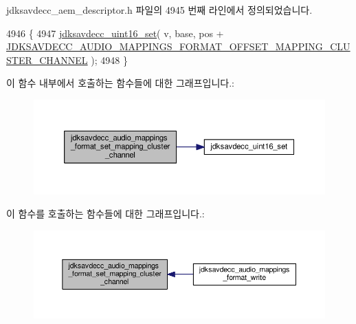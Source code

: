 jdksavdecc\+\_\+aem\+\_\+descriptor.\+h 파일의 4945 번째 라인에서 정의되었습니다.


\begin{DoxyCode}
4946 \{
4947     \hyperlink{group__endian_ga14b9eeadc05f94334096c127c955a60b}{jdksavdecc\_uint16\_set}( v, base, pos + 
      \hyperlink{group__audio__mappings__format_gada8b69df4c259ff90dd16955a184183c}{JDKSAVDECC\_AUDIO\_MAPPINGS\_FORMAT\_OFFSET\_MAPPING\_CLUSTER\_CHANNEL}
       );
4948 \}
\end{DoxyCode}


이 함수 내부에서 호출하는 함수들에 대한 그래프입니다.\+:
\nopagebreak
\begin{figure}[H]
\begin{center}
\leavevmode
\includegraphics[width=350pt]{group__audio__mappings__format_ga777e2ccdef88d311abffb4ccd193b34c_cgraph}
\end{center}
\end{figure}




이 함수를 호출하는 함수들에 대한 그래프입니다.\+:
\nopagebreak
\begin{figure}[H]
\begin{center}
\leavevmode
\includegraphics[width=350pt]{group__audio__mappings__format_ga777e2ccdef88d311abffb4ccd193b34c_icgraph}
\end{center}
\end{figure}


